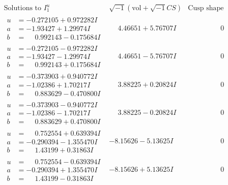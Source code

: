 \documentclass[1p]{elsarticle_modified}
\theoremstyle{definition}
\newcommand{\I}{\sqrt{-1}}
\begin{document}
$$\begin{array}{c|c|c}  
\text{Solutions to }I^u_{1}& \I (\text{vol} + \sqrt{-1}CS) & \text{Cusp shape}\\
 \hline 
\begin{aligned}
u &= -0.272105 + 0.972282 I \\
a &= -1.93427 + 1.29974 I \\
b &= \phantom{-}0.992143 - 0.175684 I\end{aligned}
 & \phantom{-}4.46651 + 5.76707 I & \phantom{-0.000000 } 0 \\ \hline\begin{aligned}
u &= -0.272105 - 0.972282 I \\
a &= -1.93427 - 1.29974 I \\
b &= \phantom{-}0.992143 + 0.175684 I\end{aligned}
 & \phantom{-}4.46651 - 5.76707 I & \phantom{-0.000000 } 0 \\ \hline\begin{aligned}
u &= -0.373903 + 0.940772 I \\
a &= -1.02386 + 1.70217 I \\
b &= \phantom{-}0.883629 - 0.470800 I\end{aligned}
 & \phantom{-}3.88225 + 0.20824 I & \phantom{-0.000000 } 0 \\ \hline\begin{aligned}
u &= -0.373903 - 0.940772 I \\
a &= -1.02386 - 1.70217 I \\
b &= \phantom{-}0.883629 + 0.470800 I\end{aligned}
 & \phantom{-}3.88225 - 0.20824 I & \phantom{-0.000000 } 0 \\ \hline\begin{aligned}
u &= \phantom{-}0.752554 + 0.639394 I \\
a &= -0.290394 - 1.355470 I \\
b &= \phantom{-}1.43199 + 0.31863 I\end{aligned}
 & -8.15626 - 5.13625 I & \phantom{-0.000000 } 0 \\ \hline\begin{aligned}
u &= \phantom{-}0.752554 - 0.639394 I \\
a &= -0.290394 + 1.355470 I \\
b &= \phantom{-}1.43199 - 0.31863 I\end{aligned}
 & -8.15626 + 5.13625 I & \phantom{-0.000000 } 0 \\ \hline\begin{aligned}

\end{aligned}
\end{array}$$
\end{document}

